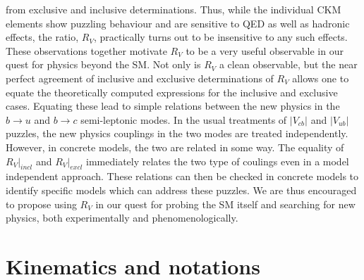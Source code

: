 \documentclass[a4paper,11pt]{article}
\begin{document}
	 from exclusive and inclusive determinations. Thus, while the individual CKM elements show puzzling behaviour and are sensitive
	 to QED as well as hadronic effects, the ratio, $R_V$, practically turns out to be insensitive to any such effects. These observations
	 together motivate $R_V$ to be a very useful observable in our quest for physics beyond the SM. Not only is $R_V$ a clean observable,
	 but the near perfect agreement of inclusive and exclusive determinations of $R_V$ allows one to equate the theoretically computed
	 expressions for the inclusive and exclusive cases. Equating these lead to simple relations between the new physics in
	 the $b\to u$ and $b\to c$ semi-leptonic modes. In the usual treatments of $|V_{cb}|$ and $|V_{ub}|$ puzzles, the new physics couplings
	 in the two modes are treated independently. However, in concrete models, the two are related in some way. The equality of $R_V|_{incl}$
	 and $R_V|_{excl}$ immediately relates the two type of coulings even in a model independent approach. These relations can then
	 be checked in concrete models to identify specific models which can address these puzzles.
	 We are thus encouraged to propose using $R_V$ in our quest for probing the SM itself and searching for new physics,
	 both experimentally and phenomenologically. 
	 
\appendix
\section{Kinematics and notations}
		\label{appa}
\end{document}

